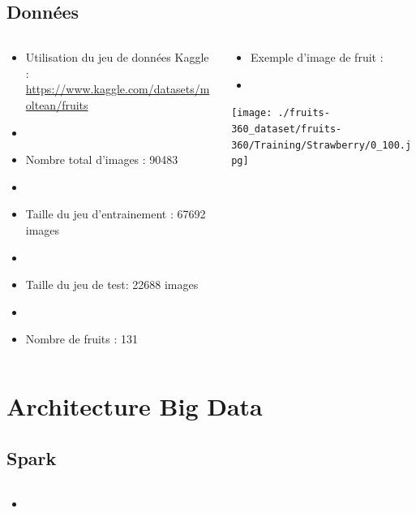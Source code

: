 \documentclass[8pt,aspectratio=169,hyperref={unicode=true}]{beamer}
\begin{document}
\subsection{Données}
\begin{frame}{\insertsubsection}
  \begin{columns}
    \begin{column}{.6\textwidth}
      \begin{itemize}
        \item Utilisation du jeu de données Kaggle : \url{https://www.kaggle.com/datasets/moltean/fruits}
        \item[]
        \item Nombre total d'images : 90483
        \item[]
        \item Taille du jeu d'entrainement : 67692 images
        \item[]
        \item Taille du jeu de test: 22688 images
        \item[]
        \item  Nombre de fruits : 131
      \end{itemize}
    \end{column}
    \begin{column}{.4\textwidth}
      \begin{itemize}
        \item Exemple d'image de fruit :
        \item[]
      \end{itemize}
      \texttt{[image: ./fruits-360\_dataset/fruits-360/Training/Strawberry/0\_100.jpg]}
    \end{column}
  \end{columns}
\end{frame}

\section{Architecture Big Data}
\subsection{Spark}
\begin{frame}{\insertsubsection}
  \begin{columns}
    \begin{column}{.6\textwidth}
      \begin{itemize}
        \item
      \end{itemize}
    \end{column}
  \end{columns}
\end{frame}
\end{document}
